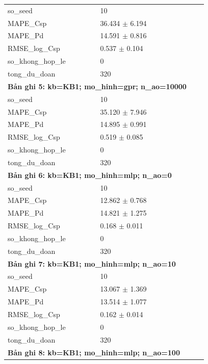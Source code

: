 \begin{longtable}{p{0.43\linewidth}p{0.50\linewidth}}
so\_\allowbreak seed & 10 \\
MAPE\_\allowbreak Csp & 36.434 $\pm$ 6.194 \\
MAPE\_\allowbreak Pd & 14.591 $\pm$ 0.816 \\
RMSE\_\allowbreak log\_\allowbreak Csp & 0.537 $\pm$ 0.104 \\
so\_\allowbreak khong\_\allowbreak hop\_\allowbreak le & 0 \\
tong\_\allowbreak du\_\allowbreak doan & 320 \\
\midrule
\multicolumn{2}{p{0.95\linewidth}}{\textbf{Bản ghi 5: kb=KB1; mo\_hinh=gpr; n\_ao=10000}} \\
so\_\allowbreak seed & 10 \\
MAPE\_\allowbreak Csp & 35.120 $\pm$ 7.946 \\
MAPE\_\allowbreak Pd & 14.895 $\pm$ 0.991 \\
RMSE\_\allowbreak log\_\allowbreak Csp & 0.519 $\pm$ 0.085 \\
so\_\allowbreak khong\_\allowbreak hop\_\allowbreak le & 0 \\
tong\_\allowbreak du\_\allowbreak doan & 320 \\
\midrule
\multicolumn{2}{p{0.95\linewidth}}{\textbf{Bản ghi 6: kb=KB1; mo\_hinh=mlp; n\_ao=0}} \\
so\_\allowbreak seed & 10 \\
MAPE\_\allowbreak Csp & 12.862 $\pm$ 0.768 \\
MAPE\_\allowbreak Pd & 14.821 $\pm$ 1.275 \\
RMSE\_\allowbreak log\_\allowbreak Csp & 0.168 $\pm$ 0.011 \\
so\_\allowbreak khong\_\allowbreak hop\_\allowbreak le & 0 \\
tong\_\allowbreak du\_\allowbreak doan & 320 \\
\midrule
\multicolumn{2}{p{0.95\linewidth}}{\textbf{Bản ghi 7: kb=KB1; mo\_hinh=mlp; n\_ao=10}} \\
so\_\allowbreak seed & 10 \\
MAPE\_\allowbreak Csp & 13.067 $\pm$ 1.369 \\
MAPE\_\allowbreak Pd & 13.514 $\pm$ 1.077 \\
RMSE\_\allowbreak log\_\allowbreak Csp & 0.162 $\pm$ 0.014 \\
so\_\allowbreak khong\_\allowbreak hop\_\allowbreak le & 0 \\
tong\_\allowbreak du\_\allowbreak doan & 320 \\
\midrule
\multicolumn{2}{p{0.95\linewidth}}{\textbf{Bản ghi 8: kb=KB1; mo\_hinh=mlp; n\_ao=100}} \\

\end{longtable}

